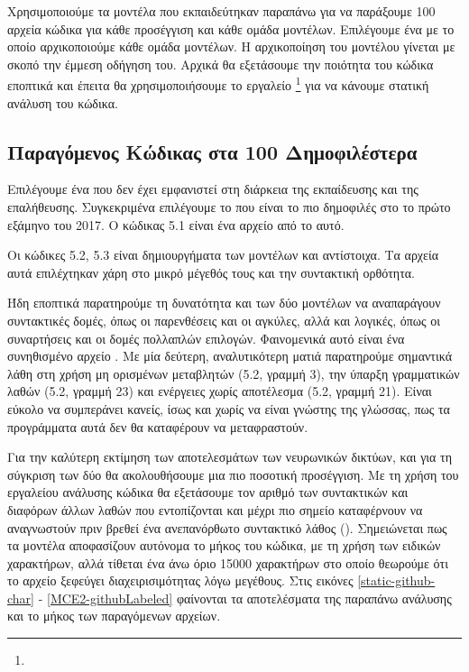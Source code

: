Χρησιμοποιούμε τα μοντέλα που εκπαιδεύτηκαν παραπάνω για να παράξουμε 100 αρχεία κώδικα για κάθε προσέγγιση και κάθε ομάδα μοντέλων.
Επιλέγουμε ένα  με το οποίο αρχικοποιούμε κάθε ομάδα μοντέλων. 
Η αρχικοποίηση του μοντέλου γίνεται με σκοπό την έμμεση οδήγηση του.
Αρχικά θα εξετάσουμε την ποιότητα του κώδικα εποπτικά και έπειτα θα χρησιμοποιήσουμε το εργαλείο \footnote{} για να κάνουμε στατική ανάλυση του κώδικα.

\subsection{Παραγόμενος Κώδικας στα 100 Δημοφιλέστερα }

Επιλέγουμε ένα  που δεν έχει εμφανιστεί στη διάρκεια της εκπαίδευσης και της επαλήθευσης.
Συγκεκριμένα επιλέγουμε το  που είναι το πιο δημοφιλές  στο  το πρώτο εξάμηνο του 2017.
Ο κώδικας 5.1 είναι ένα αρχείο από το  αυτό.



Οι κώδικες 5.2, 5.3 είναι δημιουργήματα των μοντέλων  και  αντίστοιχα. Τα αρχεία αυτά επιλέχτηκαν χάρη στο μικρό μέγεθός τους και την συντακτική ορθότητα.

Ήδη εποπτικά παρατηρούμε τη δυνατότητα και των δύο μοντέλων να αναπαράγουν συντακτικές δομές, όπως οι παρενθέσεις και οι αγκύλες, αλλά και λογικές, όπως οι συναρτήσεις και οι δομές πολλαπλών επιλογών.
Φαινομενικά αυτό είναι ένα συνηθισμένο αρχείο .
Με μία δεύτερη, αναλυτικότερη ματιά παρατηρούμε σημαντικά λάθη στη χρήση μη ορισμένων μεταβλητών (5.2, γραμμή 3), την ύπαρξη γραμματικών λαθών (5.2, γραμμή 23) και ενέργειες χωρίς αποτέλεσμα (5.2, γραμμή 21). 
Είναι εύκολο να συμπεράνει κανείς, ίσως και χωρίς να είναι γνώστης της γλώσσας, πως τα προγράμματα αυτά δεν θα καταφέρουν να μεταφραστούν.
\pagebreak


 
Για την καλύτερη εκτίμηση των αποτελεσμάτων των νευρωνικών δικτύων, και για τη σύγκριση των δύο  θα ακολουθήσουμε μια πιο ποσοτική προσέγγιση. 
Με τη χρήση του εργαλείου ανάλυσης κώδικα  θα εξετάσουμε τον αριθμό των συντακτικών και διαφόρων άλλων λαθών  που εντοπίζονται και μέχρι πιο σημείο καταφέρνουν να αναγνωστούν πριν βρεθεί ένα ανεπανόρθωτο συντακτικό λάθος ().
Σημειώνεται πως τα μοντέλα αποφασίζουν αυτόνομα το μήκος του κώδικα, με τη χρήση των ειδικών χαρακτήρων, αλλά τίθεται ένα άνω όριο 15000 χαρακτήρων στο οποίο θεωρούμε ότι το αρχείο ξεφεύγει διαχειρισιμότητας λόγω μεγέθους.
Στις εικόνες \ref{static-github-char} - \ref{MCE2-githubLabeled} φαίνονται τα αποτελέσματα της παραπάνω ανάλυσης και το μήκος των παραγόμενων αρχείων.

